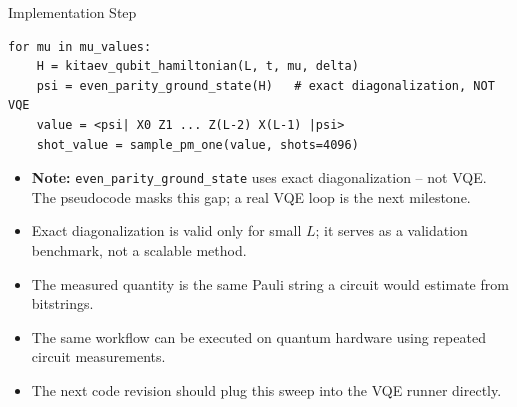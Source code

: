\documentclass[aspectratio=169, 12pt]{beamer}
\begin{document}
\begin{frame}[fragile]{Implementation Step}

  \begin{lstlisting}[basicstyle=\ttfamily\scriptsize]
for mu in mu_values:
    H = kitaev_qubit_hamiltonian(L, t, mu, delta)
    psi = even_parity_ground_state(H)   # exact diagonalization, NOT VQE
    value = <psi| X0 Z1 ... Z(L-2) X(L-1) |psi>
    shot_value = sample_pm_one(value, shots=4096)
  \end{lstlisting}

  \begin{itemize}

    \item \textbf{Note:} \texttt{even\_parity\_ground\_state} uses exact diagonalization -- not VQE. The pseudocode masks this gap; a real VQE loop is the next milestone.

    \item Exact diagonalization is valid only for small $L$; it serves as a validation benchmark, not a scalable method.

    \item The measured quantity is the same Pauli string a circuit would estimate from bitstrings.

    \item The same workflow can be executed on quantum hardware using repeated circuit measurements.

    \item The next code revision should plug this sweep into the VQE runner directly.

  \end{itemize}

\end{frame}

\end{document}
